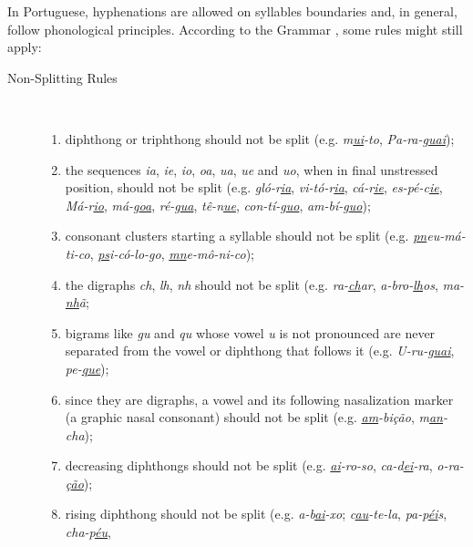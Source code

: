 In Portuguese, hyphenations are allowed on syllables boundaries and, in
general, follow phonological principles.  According to the Grammar
\parencite{cunha2016,bergstrom2011,cegalla2008}, some rules might still apply:
\begin{description}
    \item[Non-Splitting Rules]\  

\begin{enumerate}
    \item\label{rule-di-triphthong} diphthong or triphthong should not be split
	(e.g. \emph{m\underline{ui}-to}, \emph{Pa-ra-g\underline{uai}});
    \item\label{rule-unstressed} the sequences \emph{ia}, \emph{ie}, \emph{io}, \emph{oa}, \emph{ua},
	\emph{ue} and \emph{uo}, when in final unstressed position, should not be split 
	(e.g. \emph{gló-r\underline{ia}}, \emph{vi-tó-r\underline{ia}}, 
	\emph{cá-r\underline{ie}}, \emph{es-pé-c\underline{ie}}, 
	\emph{Má-r\underline{io}}, \emph{má-g\underline{oa}}, 
	\emph{ré-g\underline{ua}}, \emph{tê-n\underline{ue}}, 
	\emph{con-tí-g\underline{uo}}, \emph{am-bí-g\underline{uo}});
    \item\label{rule-c-clusters} consonant clusters starting a syllable should not be
	split (e.g. \emph{\underline{pn}eu-má-ti-co}, \emph{\underline{ps}i-có-lo-go}, 
	\emph{\underline{mn}e-mô-ni-co});
    \item\label{rules-digraphs-ns} the digraphs	\emph{ch}, \emph{lh}, \emph{nh}
	should not be split (e.g. \emph{ra-\underline{ch}ar},
	\emph{a-bro-\underline{lh}os}, \emph{ma-\underline{nh}ã};
    \item\label{rule-guqu} bigrams like \emph{gu} and \emph{qu} whose vowel \emph{u} is not 
	pronounced are never separated from the vowel or diphthong that follows it 
	(e.g. \emph{U-ru-\underline{guai}}, \emph{pe-\underline{que}});
    \item\label{rule-nasalization} since they are digraphs, a vowel and its following 
	nasalization marker (a graphic nasal consonant) should not be split (e.g. \emph{\underline{am}-bição},
	\emph{m\underline{an}-cha});
    \item\label{rule-decreasing} decreasing diphthongs should not be split (e.g. 
	\emph{\underline{ai}-ro-so}, \emph{ca-d\underline{ei}-ra}, 
	\emph{o-ra-ç\underline{ão}});
    \item\label{rule-rising} rising diphthong should not be split (e.g.
	\emph{a-b\underline{ai}-xo}; \emph{c\underline{au}-te-la}, 
	\emph{pa-p\underline{éi}s}, \emph{cha-p\underline{éu}}, 

\end{enumerate}
\end{description}
